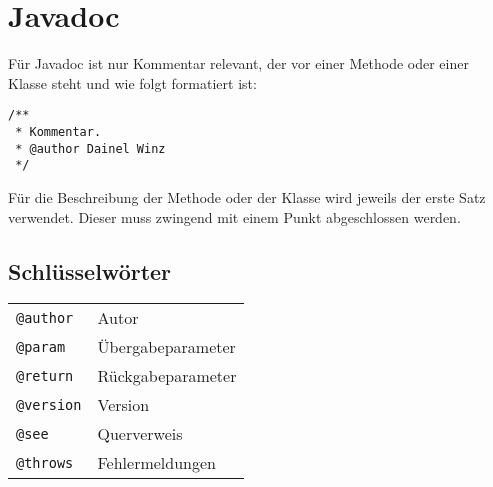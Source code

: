 



\section{Javadoc}
Für Javadoc ist nur Kommentar relevant, der vor einer Methode oder einer 
Klasse steht und wie folgt formatiert ist: 
\begin{lstlisting}[caption=Kommentar im Javadoc Style]
/**
 * Kommentar. 
 * @author Dainel Winz
 */
\end{lstlisting}
Für die Beschreibung der Methode oder der Klasse wird jeweils der erste Satz 
verwendet. Dieser muss zwingend mit einem Punkt abgeschlossen werden. 

\subsection{Schlüsselwörter}
\begin{tabular}{ll}
\verb?@author? & Autor \\
\verb?@param? & Übergabeparameter \\
\verb?@return? & Rückgabeparameter \\
\verb?@version? & Version \\
\verb?@see? & Querverweis \\
\verb?@throws? & Fehlermeldungen 
\end{tabular}
